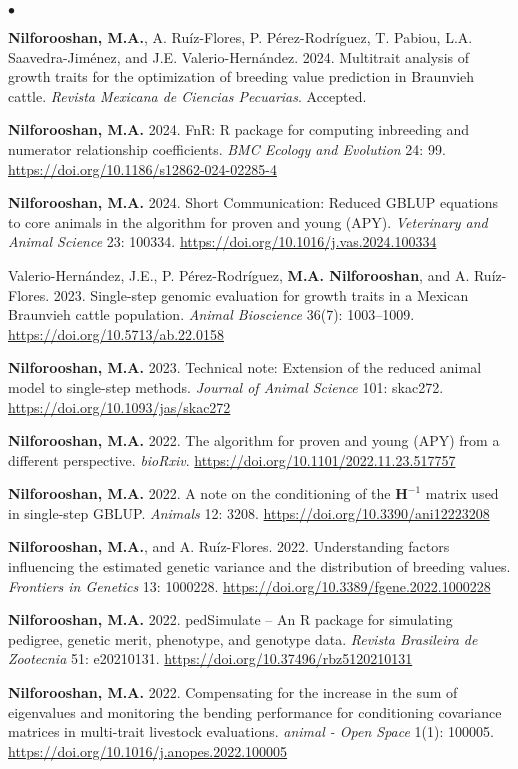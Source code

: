 \documentclass[margin,line]{res}
\newenvironment{list2}{
  \begin{list}{$\bullet$}{%
      \setlength{\itemsep}{0in}
      \setlength{\parsep}{0in} \setlength{\parskip}{0in}
      \setlength{\topsep}{0in} \setlength{\partopsep}{0in}
      \setlength{\leftmargin}{0.2in}}}{\end{list}}
\begin{document}
\begin{resume}
  \begin{list2}
    \item {\bf Nilforooshan, M.A.}, A. Ru\'{i}z-Flores, P. P\'{e}rez-Rodr\'{i}guez, T. Pabiou, L.A. Saavedra-Jim\'{e}nez, and J.E. Valerio-Hern\'{a}ndez. 2024. Multitrait analysis of growth traits for the optimization of breeding value prediction in Braunvieh cattle. {\em Revista Mexicana de Ciencias Pecuarias}. Accepted.
    \item {\bf Nilforooshan, M.A.} 2024. FnR: R package for computing inbreeding and numerator relationship coefficients. {\em BMC Ecology and Evolution} 24: 99. \url{https://doi.org/10.1186/s12862-024-02285-4}
    \item {\bf Nilforooshan, M.A.} 2024. Short Communication: Reduced GBLUP equations to core animals in the algorithm for proven and young (APY). {\em Veterinary and Animal Science} 23: 100334. \url{https://doi.org/10.1016/j.vas.2024.100334}
    \item Valerio-Hern\'{a}ndez, J.E., P. P\'{e}rez-Rodr\'{i}guez, {\bf M.A. Nilforooshan}, and A. Ru\'{i}z-Flores. 2023. Single-step genomic evaluation for growth traits in a Mexican Braunvieh cattle population. {\em Animal Bioscience} 36(7): 1003--1009. \url{https://doi.org/10.5713/ab.22.0158}
    \item {\bf Nilforooshan, M.A.} 2023. Technical note: Extension of the reduced animal model to single-step methods. {\em Journal of Animal Science} 101: skac272. \url{https://doi.org/10.1093/jas/skac272}
    \item {\bf Nilforooshan, M.A.} 2022. The algorithm for proven and young (APY) from a different perspective. {\em bioRxiv}. \url{https://doi.org/10.1101/2022.11.23.517757}
    \item {\bf Nilforooshan, M.A.} 2022. A note on the conditioning of the $\mathbf H^{-1}$ matrix used in single-step GBLUP. {\em Animals} 12: 3208. \url{https://doi.org/10.3390/ani12223208}
    \item {\bf Nilforooshan, M.A.}, and A. Ru\'{i}z-Flores. 2022. Understanding factors influencing the estimated genetic variance and the distribution of breeding values. {\em Frontiers in Genetics} 13: 1000228. \url{https://doi.org/10.3389/fgene.2022.1000228}
    \item {\bf Nilforooshan, M.A.} 2022. pedSimulate -- An R package for simulating pedigree, genetic merit, phenotype, and genotype data. {\em Revista Brasileira de Zootecnia} 51: e20210131. \url{https://doi.org/10.37496/rbz5120210131}
    \item {\bf Nilforooshan, M.A.} 2022. Compensating for the increase in the sum of eigenvalues and monitoring the bending performance for conditioning covariance matrices in multi-trait livestock evaluations. {\em animal - Open Space} 1(1): 100005. \url{https://doi.org/10.1016/j.anopes.2022.100005}

\end{list2}
\end{resume}
\end{document}
